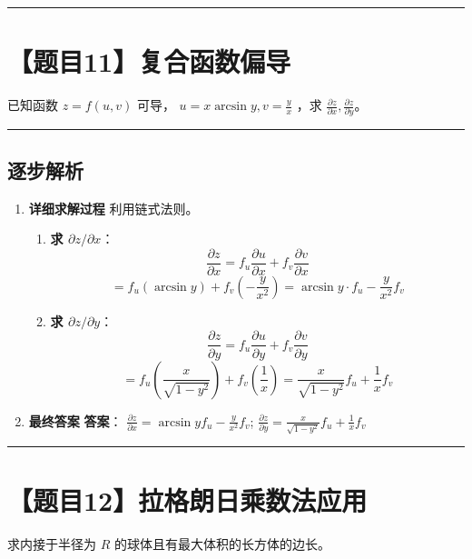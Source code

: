 \documentclass[UTF8]{ctexart}
\newenvironment{redenv}{\color{red}}{}
\newenvironment{detailedanalysis}{%
    \color{red}
    \begin{enumerate}[label=\textbf{第\arabic*步：}, leftmargin=*, align=left, itemsep=1.5ex]
}{%
    \end{enumerate}
}
\newcommand{\problemrule}{\noindent\rule{\textwidth}{1.5pt}\vspace{-0.8em}}
\newcommand{\analysisrule}{\noindent\rule{\textwidth}{0.8pt}\vspace{-0.8em}}
\begin{document}
\problemrule
\section*{【题目11】复合函数偏导}
已知函数 $ z = f(u, v) $ 可导， $ u = x \arcsin y, v = \frac{y}{x} $ ，求 $ \frac{\partial z}{\partial x}, \frac{\partial z}{\partial y} $。

\begin{redenv}
\analysisrule
\subsection*{逐步解析}

\begin{detailedanalysis}
\item \textbf{详细求解过程}
利用链式法则。
\begin{enumerate}[label=(\arabic*)]
\item \textbf{求 $\partial z / \partial x$}：
$$ \frac{\partial z}{\partial x} = f_u \frac{\partial u}{\partial x} + f_v \frac{\partial v}{\partial x} $$
$$ = f_u (\arcsin y) + f_v (-\frac{y}{x^2}) = \arcsin y \cdot f_u - \frac{y}{x^2} f_v $$
\item \textbf{求 $\partial z / \partial y$}：
$$ \frac{\partial z}{\partial y} = f_u \frac{\partial u}{\partial y} + f_v \frac{\partial v}{\partial y} $$
$$ = f_u (\frac{x}{\sqrt{1-y^2}}) + f_v (\frac{1}{x}) = \frac{x}{\sqrt{1-y^2}} f_u + \frac{1}{x} f_v $$
\end{enumerate}

\item \textbf{最终答案}
\textbf{答案}：
$ \frac{\partial z}{\partial x} = \arcsin y f_{u} - \frac{y}{x^{2}} f_{v} $;
$ \frac{\partial z}{\partial y} = \frac{x}{\sqrt{1-y^{2}}} f_{u} + \frac{1}{x} f_{v} $
\end{detailedanalysis}
\end{redenv}

\problemrule
\section*{【题目12】拉格朗日乘数法应用}
求内接于半径为 $R$ 的球体且有最大体积的长方体的边长。
\end{document}
